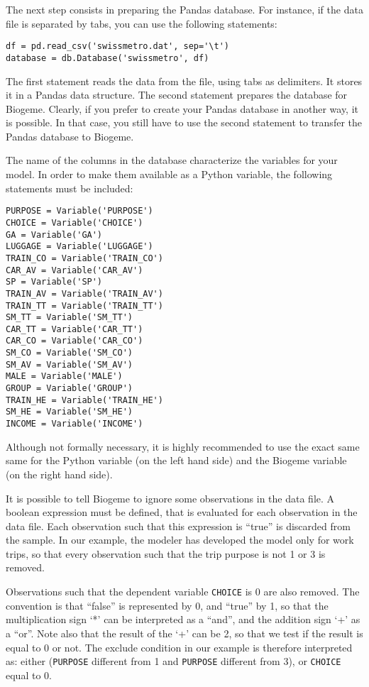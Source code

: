 \documentclass[12pt,a4paper]{article}
\begin{document}
The next step consists in preparing the Pandas database. For instance, if the data file is separated by tabs, you can use the
following statements:
\begin{lstlisting}[style=nonumbers]
df = pd.read_csv('swissmetro.dat', sep='\t')
database = db.Database('swissmetro', df)
\end{lstlisting}
The first statement reads the data from the file, using tabs as
delimiters. It stores it in a
Pandas data structure. The second statement prepares the database for
Biogeme. 
Clearly, if you prefer to create your Pandas database in another way,
it is possible. In that case, you still have to use the second statement to
transfer the Pandas database to Biogeme. 

The name of the columns in the database characterize the variables for
your model. In order to make them available as a Python variable, the
following statements must be included: 
\begin{lstlisting}[style=nonumbers]
PURPOSE = Variable('PURPOSE')
CHOICE = Variable('CHOICE')
GA = Variable('GA')
LUGGAGE = Variable('LUGGAGE')
TRAIN_CO = Variable('TRAIN_CO')
CAR_AV = Variable('CAR_AV')
SP = Variable('SP')
TRAIN_AV = Variable('TRAIN_AV')
TRAIN_TT = Variable('TRAIN_TT')
SM_TT = Variable('SM_TT')
CAR_TT = Variable('CAR_TT')
CAR_CO = Variable('CAR_CO')
SM_CO = Variable('SM_CO')
SM_AV = Variable('SM_AV')
MALE = Variable('MALE')
GROUP = Variable('GROUP')
TRAIN_HE = Variable('TRAIN_HE')
SM_HE = Variable('SM_HE')
INCOME = Variable('INCOME')
\end{lstlisting}

Although not formally necessary, it is highly recommended to use the exact same same for the Python variable (on the left hand side) and the Biogeme variable (on the right hand side).

It is possible to tell Biogeme to ignore some
observations in the data file. A boolean expression must be defined, that
is evaluated for each observation in the data file.  Each observation
such that this expression is ``true'' is discarded from the
sample. In our example, the modeler has developed the model only for
work trips, so that every observation such that the trip purpose is not 1
or 3 is removed.

Observations such that the dependent variable \lstinline$CHOICE$ is 0 are also
removed. The convention is that ``false'' is represented by 0,
and ``true'' by 1, so that the multiplication sign `*' can be interpreted as a ``and'',
and the addition sign `+' as a ``or''. Note also that the result of the `+' can be
2, so that we test if the result is equal to 0 or not. The exclude condition in our example is
therefore interpreted as: either (\lstinline$PURPOSE$ different from 1
and \lstinline$PURPOSE$ different from 3), or \lstinline$CHOICE$ equal
to 0. 
\end{document}
